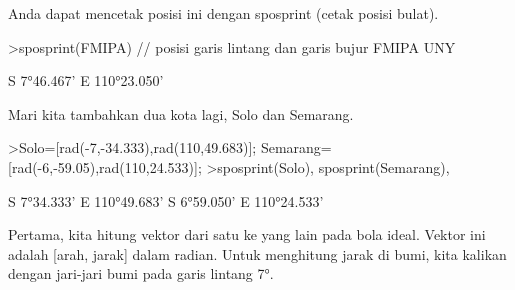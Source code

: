 \documentclass[a4paper,10pt]{article}
\begin{document}
\begin{eulernotebook}
\begin{eulercomment}
\begin{eulercomment}
\begin{eulercomment}
\begin{eulercomment}
\begin{eulercomment}
\begin{eulercomment}
\begin{eulercomment}
\begin{eulercomment}
\begin{eulercomment}
\begin{eulercomment}
\begin{eulercomment}
\begin{eulercomment}
\begin{eulercomment}
\begin{eulercomment}
\begin{eulercomment}
\begin{eulercomment}
\begin{eulercomment}
\begin{eulercomment}
\begin{eulercomment}
\begin{eulercomment}
\begin{eulercomment}
\begin{eulercomment}
\begin{eulercomment}
\begin{eulercomment}
\begin{eulercomment}
\begin{eulercomment}
\begin{eulercomment}
\begin{eulercomment}
\begin{eulercomment}
\begin{eulercomment}
\begin{eulercomment}
\begin{eulercomment}
\begin{eulercomment}
\begin{eulercomment}
\begin{eulercomment}
\begin{eulercomment}
\begin{eulercomment}
\begin{eulercomment}
\begin{eulercomment}
\begin{eulercomment}
\begin{eulercomment}
\begin{eulercomment}
\begin{euleroutput}
  [-0.13569,  1.92657]
\end{euleroutput}
\begin{eulercomment}
Anda dapat mencetak posisi ini dengan sposprint (cetak posisi bulat).
\end{eulercomment}
\begin{eulerprompt}
>sposprint(FMIPA) // posisi garis lintang dan garis bujur FMIPA UNY
\end{eulerprompt}
\begin{euleroutput}
  S 7°46.467' E 110°23.050'
\end{euleroutput}
\begin{eulercomment}
Mari kita tambahkan dua kota lagi, Solo dan Semarang.
\end{eulercomment}
\begin{eulerprompt}
>Solo=[rad(-7,-34.333),rad(110,49.683)]; Semarang=[rad(-6,-59.05),rad(110,24.533)];
>sposprint(Solo), sposprint(Semarang),
\end{eulerprompt}
\begin{euleroutput}
  S 7°34.333' E 110°49.683'
  S 6°59.050' E 110°24.533'
\end{euleroutput}
\begin{eulercomment}
Pertama, kita hitung vektor dari satu ke yang lain pada bola ideal.
Vektor ini adalah [arah, jarak] dalam radian. Untuk menghitung jarak
di bumi, kita kalikan dengan jari-jari bumi pada garis lintang 7°.
\end{eulercomment}
\begin{eulerprompt}

\end{eulerprompt}
\end{eulercomment}
\end{eulercomment}
\end{eulercomment}
\end{eulercomment}
\end{eulercomment}
\end{eulercomment}
\end{eulercomment}
\end{eulercomment}
\end{eulercomment}
\end{eulercomment}
\end{eulercomment}
\end{eulercomment}
\end{eulercomment}
\end{eulercomment}
\end{eulercomment}
\end{eulercomment}
\end{eulercomment}
\end{eulercomment}
\end{eulercomment}
\end{eulercomment}
\end{eulercomment}
\end{eulercomment}
\end{eulercomment}
\end{eulercomment}
\end{eulercomment}
\end{eulercomment}
\end{eulercomment}
\end{eulercomment}
\end{eulercomment}
\end{eulercomment}
\end{eulercomment}
\end{eulercomment}
\end{eulercomment}
\end{eulercomment}
\end{eulercomment}
\end{eulercomment}
\end{eulercomment}
\end{eulercomment}
\end{eulercomment}
\end{eulercomment}
\end{eulercomment}
\end{eulercomment}
\end{eulernotebook}
\end{document}
